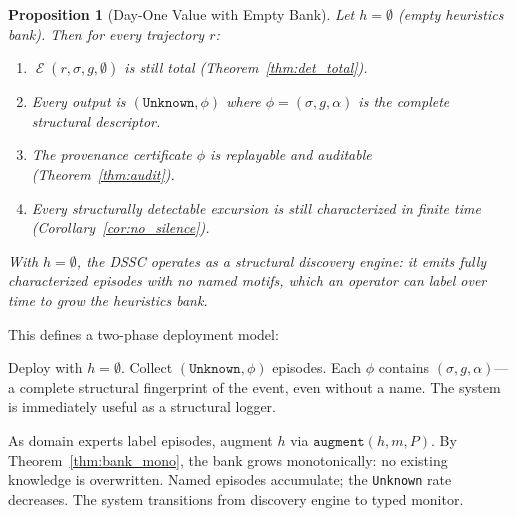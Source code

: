 \documentclass[11pt,a4paper]{article}
\theoremstyle{plain}
\newtheorem{proposition}[theorem]{Proposition}
\theoremstyle{definition}
\theoremstyle{remark}
\DeclareMathOperator{\Endo}{\mathcal{E}}
\begin{document}
\begin{proposition}[Day-One Value with Empty Bank]
\label{prop:empty_bank}
  Let $h = \emptyset$ (empty heuristics bank). Then for every trajectory $r$:
  \begin{enumerate}[nosep]
    \item $\Endo(r, \sigma, g, \emptyset)$ is still total (Theorem~\ref{thm:det_total}).
    \item Every output is $(\mathtt{Unknown}, \phi)$ where $\phi = (\sigma, g, \alpha)$ is
      the complete structural descriptor.
    \item The provenance certificate $\phi$ is replayable and auditable (Theorem~\ref{thm:audit}).
    \item Every structurally detectable excursion is still characterized in finite time
      (Corollary~\ref{cor:no_silence}).
  \end{enumerate}
  With $h = \emptyset$, the DSSC operates as a \emph{structural discovery engine}: it emits
  fully characterized episodes with no named motifs, which an operator can label over time to
  grow the heuristics bank.
\end{proposition}

This defines a two-phase deployment model:
\begin{description}[nosep,leftmargin=1.5em]
  \item[Phase~1 (Discovery):] Deploy with $h = \emptyset$. Collect $(\mathtt{Unknown}, \phi)$
    episodes. Each $\phi$ contains $(\sigma, g, \alpha)$---a complete structural fingerprint of
    the event, even without a name. The system is immediately useful as a structural logger.
  \item[Phase~2 (Monitoring):] As domain experts label episodes, augment $h$ via
    $\mathtt{augment}(h, m, P)$. By Theorem~\ref{thm:bank_mono}, the bank grows
    monotonically: no existing knowledge is overwritten. Named episodes accumulate; the
    \texttt{Unknown} rate decreases. The system transitions from discovery engine to typed monitor.
\end{description}
\end{document}
